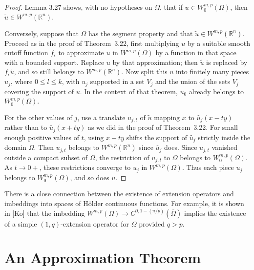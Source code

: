 \begin{proof}
  Lemma 3.27 shows, with no hypotheses on $\Omega$, that if $u\in W_0^{m,p}(\Omega)$,
  then $\tilde u\in W^{m,p}(\mathbb{R}^n)$.

  Conversely, suppose that $\Omega$ has the segment property and that
  $\tilde u\in W^{m,p}(\mathbb{R}^n)$. Proceed as in the proof of Theorem~3.22,
  first multiplying $u$ by a suitable smooth cutoff function $f_{\epsilon}$
  to approximate $u$ in $W^{m,p}(\Omega)$ by a function in that space
  with a bounded support. Replace $u$ by that approximation; then $\tilde u$
  is replaced by $f_{\epsilon} \tilde{u}$, and so still belongs to
  $W^{m,p}(\mathbb{R}^n)$. Now split this $u$ into finitely many pieces $u_j$,
  where $0\leq l\leq k$, with $u_j$ supported in a set $V_j$ and the union
  of the sets $V_j$ covering the support of $u$. In the context of that
  theorem, $u_0$ already belongs to $W_0^{m,p}(\Omega)$.

  For the other values of $j$, use a translate $u_{j,t}$ of $\tilde u$
  mapping $x$ to $\tilde{u_j}(x-ty)$ rather than to $\tilde{u_j}(x+ty)$
  as we did in the proof of Theorem~3.22. For small enough positive values
  of $t$, using $x-ty$ shifts the support of $\tilde{u_j}$ strictly
  inside the domain $\Omega$. Then $u_{j,t}$ belongs to $W^{m,p}(\mathbb{R}^n)$
  since $\tilde{u_j}$ does. Since $u_{j,t}$ vanished outside a compact subset
  of $\Omega$, the restriction of $u_{j,t}$ to $\Omega$ belongs to
  $W^{m,p}_0(\Omega)$. As $t\to 0+$, these restrictions converge to $u_j$
  in $W^{m,p}(\Omega)$. Thus each piece $u_j$ belongs to $W_0^{m,p}(\Omega)$,
  and so does $u$.
\end{proof}


\begin{para}
  There is a close connection between the existence of extension operators
  and imbeddings into spaces of H\"older continuous functions. For example,
  it is shown in [Ko] that the imbedding $W^{m,p}(\Omega) \to
  C^{0,1-(n/p)}(\overline{\Omega})$ implies the existence of a simple
  $(1,q)$-extension operator for $\Omega$ provided $q>p$.
\end{para}


\section{An Approximation Theorem}

